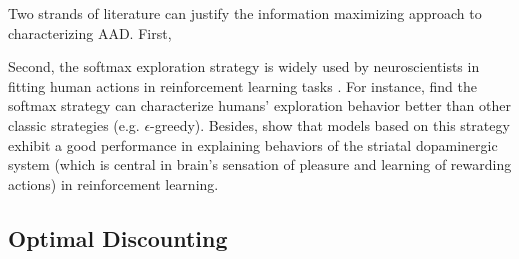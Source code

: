 \documentclass[
  12pt,
]{article}
\begin{document}
Two strands of literature can justify the information maximizing
approach to characterizing AAD. First,

Second, the softmax exploration strategy is widely used by
neuroscientists in fitting human actions in reinforcement learning tasks
\citep{daw2006cortical, niv2012neural, fitzgerald2012action, niv2015reinforcement, leong2017dynamic}.
For instance, \citet{daw2006cortical} find the softmax strategy can
characterize humans' exploration behavior better than other classic
strategies (e.g. \(\epsilon\)-greedy). Besides,
\citet{collins2014opponent} show that models based on this strategy
exhibit a good performance in explaining behaviors of the striatal
dopaminergic system (which is central in brain's sensation of pleasure
and learning of rewarding actions) in reinforcement learning.

\hypertarget{optimal-discounting}{%
\subsection{\texorpdfstring{Optimal Discounting
\label{optimal_discount}}{Optimal Discounting }}\label{optimal-discounting}}
\end{document}

